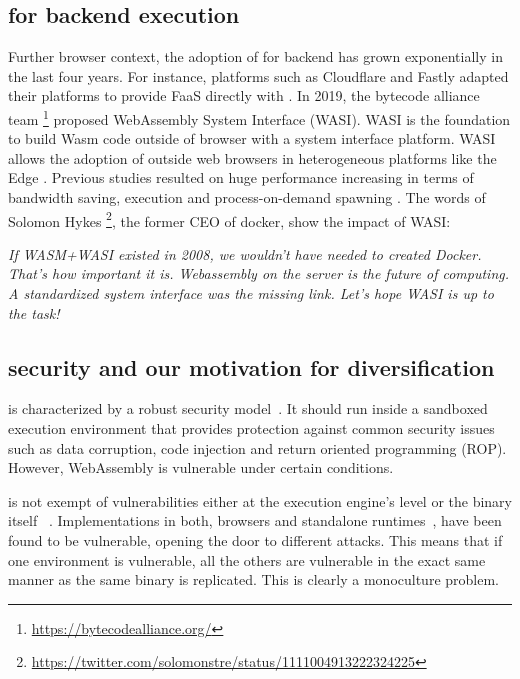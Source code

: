 \subsection*{\wasm for backend execution}

Further browser context, the adoption of \wasm for backend has grown exponentially in the last four years. For instance, platforms such as Cloudflare and Fastly adapted their platforms to provide FaaS directly with \wasm. In 2019, the bytecode alliance team \footnote{\url{https://bytecodealliance.org/}} proposed WebAssembly System Interface (WASI). WASI is the foundation to build Wasm code outside of browser with a system interface platform. WASI allows the adoption of \wasm outside web browsers \cite{bryant2020webassembly} in heterogeneous platforms like the Edge \cite{Narayan2021Swivel,Sledge}. Previous studies resulted on huge performance increasing in terms of bandwidth saving, execution and process-on-demand spawning \cite{9640153, wen2020wasmachine}.  The words of Solomon Hykes \footnote{\url{https://twitter.com/solomonstre/status/1111004913222324225}}, the former CEO of docker, show the impact of WASI: 
\begin{displayquote}
\textit{
    If WASM+WASI existed in 2008, we wouldn't have needed to created Docker. That's how important it is. Webassembly on the server is the future of computing. A standardized system interface was the missing link. Let's hope WASI is up to the task!
}
\end{displayquote}

\subsection*{\wasm security and our motivation for diversification}


\wasm is characterized by a robust security model~\cite{WebAssemblySecurity}. It should run inside a sandboxed execution environment that provides protection against common security issues such as data corruption, code injection and return oriented programming (ROP). However, WebAssembly is vulnerable under certain conditions.  

\wasm is not exempt of vulnerabilities either at the execution engine's level \cite{ChromeZero} or the binary itself ~\cite{usenixWasm2020}.
Implementations in both, browsers and standalone runtimes~\cite{Narayan2021Swivel}, have been found to be vulnerable, opening the door to different attacks.
This means that if one environment is vulnerable, all the others are vulnerable in the exact same manner as the same \wasm binary is replicated. This is clearly a monoculture problem.

